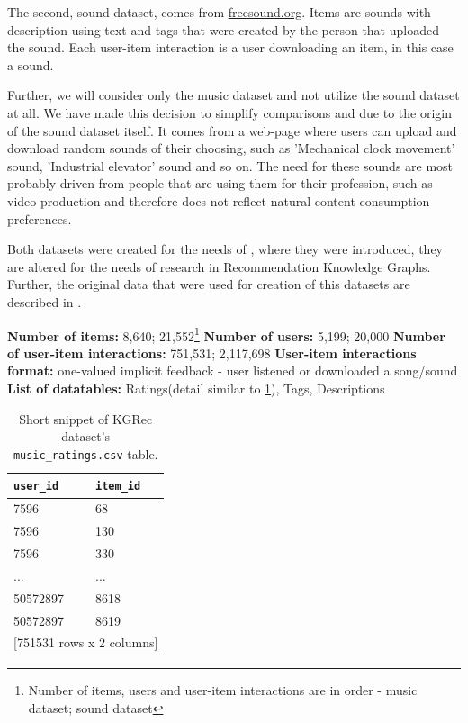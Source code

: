The second, sound dataset, comes from \href{https://freesound.org/}{freesound.org}. Items are sounds with description using text and tags that were created by the person that uploaded the sound. Each user-item interaction is a user downloading an item, in this case a sound.

Further, we will consider only the music dataset and not utilize the sound dataset at all. We have made this decision to simplify comparisons and due to the origin of the sound dataset itself. It comes from a web-page where users can upload and download random sounds of their choosing, such as 'Mechanical clock movement' sound, 'Industrial elevator' sound and so on. The need for these sounds are most probably driven from people that are using them for their profession, such as video production and therefore does not reflect natural content consumption preferences.

Both datasets were created for the needs of \cite{kgrec_dataset_origin}, where they were introduced, they are altered for the needs of research in Recommendation Knowledge Graphs. Further, the original data that were used for creation of this datasets are described in \cite{kgrec_dataset_origin_full}.


\hfill \break
\noindent
\textbf{Number of items:} 8,640; 21,552\footnote{Number of items, users and user-item interactions are in order - music dataset; sound dataset} \newline
\textbf{Number of users:} 5,199; 20,000 \newline
\textbf{Number of user-item interactions:} 751,531; 2,117,698 \newline
\textbf{User-item interactions format:} one-valued implicit feedback - user listened or downloaded a song/sound \newline
\textbf{List of datatables:} Ratings(detail similar to \ref{table:5.1_KGRec_ratings}), Tags, Descriptions

\begin{table}[!ht]
    \centering
    \begin{tabular}{ l l }
        \verb|user_id|   & \verb|item_id| \\
        \hline
        7596     &  68  \\
        7596     & 130  \\
        7596     & 330  \\
        ...      & ...  \\
        50572897 & 8618 \\
        50572897 & 8619 \\ [1mm]
        \multicolumn{2}{l}{{[751531 rows x 2 columns]}}
    \end{tabular}
    \caption{Short snippet of KGRec dataset's \texttt{music\_ratings.csv} table.}
    \label{table:5.1_KGRec_ratings}
\end{table}

